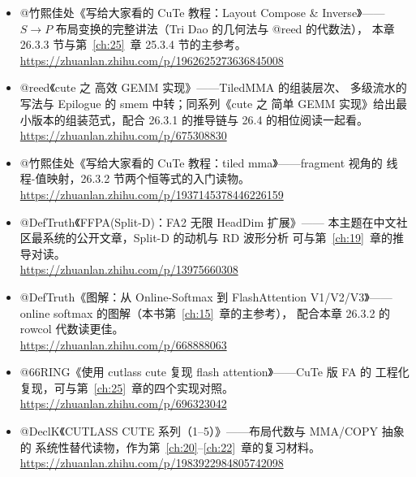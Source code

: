 \begin{itemize}[itemsep=2pt,topsep=2pt]
  \item @竹熙佳处《写给大家看的 CuTe 教程：Layout Compose \& Inverse》——
        $S\to P$ 布局变换的完整讲法（Tri Dao 的几何法与 @reed 的代数法），
        本章 26.3.3 节与第~\ref{ch:25}~章 25.3.4 节的主参考。\\
        \url{https://zhuanlan.zhihu.com/p/1962625273636845008}
  \item @reed《cute 之 高效 GEMM 实现》——TiledMMA 的组装层次、
        多级流水的写法与 Epilogue 的 smem 中转；同系列《cute 之 简单
        GEMM 实现》给出最小版本的组装范式，配合 26.3.1 的推导链与
        26.4 的相位阅读一起看。\\
        \url{https://zhuanlan.zhihu.com/p/675308830}
  \item @竹熙佳处《写给大家看的 CuTe 教程：tiled mma》——fragment 视角的
        线程-值映射，26.3.2 节两个恒等式的入门读物。\\
        \url{https://zhuanlan.zhihu.com/p/1937145378446226159}
  \item @DefTruth《FFPA(Split-D)：FA2 无限 HeadDim 扩展》——
        本主题在中文社区最系统的公开文章，Split-D 的动机与 RD 波形分析
        可与第~\ref{ch:19}~章的推导对读。\\
        \url{https://zhuanlan.zhihu.com/p/13975660308}
  \item @DefTruth《图解：从 Online-Softmax 到 FlashAttention V1/V2/V3》——
        online softmax 的图解（本书第~\ref{ch:15}~章的主参考），
        配合本章 26.3.2 的 rowcol 代数读更佳。\\
        \url{https://zhuanlan.zhihu.com/p/668888063}
  \item @66RING《使用 cutlass cute 复现 flash attention》——CuTe 版 FA 的
        工程化复现，可与第~\ref{ch:25}~章的四个实现对照。\\
        \url{https://zhuanlan.zhihu.com/p/696323042}
  \item @DeclK《CUTLASS CUTE 系列（1--5）》——布局代数与 MMA/COPY 抽象的
        系统性替代读物，作为第~\ref{ch:20}--\ref{ch:22}~章的复习材料。\\
        \url{https://zhuanlan.zhihu.com/p/1983922984805742098}
\end{itemize}
